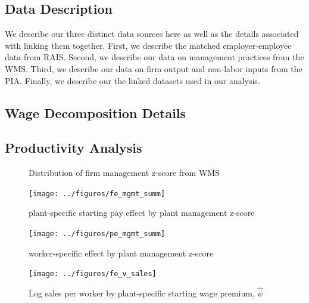 
\subsection{Data Description}
We describe our three distinct data sources here as well as the details associated with linking them together. First, we describe the matched employer-employee data from \ac{RAIS}. Second, we describe our data on management practices from the \ac{WMS}. Third, we describe our data on firm output and non-labor inputs from the \ac{PIA}. Finally, we describe our the linked datasets used in our analysis.

\subsection{Wage Decomposition Details}





\subsection{Productivity Analysis}

\begin{figure}[h]
\centering
{}
\caption{Distribution of firm management z-score from WMS }
\label{fig:mgmtscor_hist}
\end{figure}


\begin{landscape}
\begin{figure}[h]
\centering
\texttt{[image: ../figures/fe\_mgmt\_summ]}
\caption{plant-specific starting pay effect by plant management z-score}
\label{fig:mgmt_v_fe}
\end{figure}
\end{landscape}


\begin{landscape}
\begin{figure}[h]
\centering
\texttt{[image: ../figures/pe\_mgmt\_summ]}
\caption{worker-specific effect by plant management z-score}
\label{fig:mgmt_v_fe}
\end{figure}
\end{landscape}

\clearpage
\begin{figure}[h]
\centering
\texttt{[image: ../figures/fe\_v\_sales]}
\caption{Log sales per worker by plant-specific starting wage premium, $\hat{\psi}$}
\label{fig:fe_v_sales}
\end{figure}

